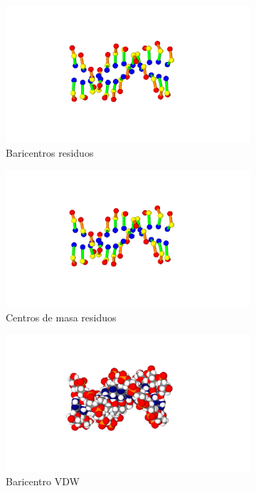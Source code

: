 \begin{figure}
\centering
\begin{subfigure}{.5\textwidth}
  \centering
  \includegraphics[width=.78\linewidth]{./Figures/1fzxresid.png}
  \caption{Baricentros residuos}
  \label{fig:sub111}
\end{subfigure}%
\begin{subfigure}{.5\textwidth}
  \centering
  \includegraphics[width=.78\linewidth]{./Figures/1fzxresid.png}
  \caption{Centros de masa residuos}
  \label{fig:sub222}
\end{subfigure}
\begin{subfigure}{.5\textwidth}
  \centering
  \includegraphics[width=.78\linewidth]{./Figures/1fzxvdw.png}
  \caption{Baricentro VDW}
  \label{fig:sub333}
\end{subfigure}%
\begin{subfigure}{.5\textwidth}

\end{subfigure}
\end{figure}
